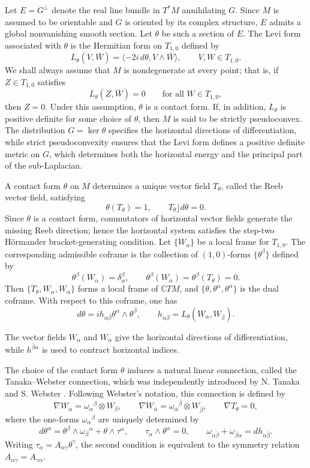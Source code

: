 \documentclass[11pt]{article}
\numberwithin{equation}{section}
\numberwithin{equation}{section}
\begin{document}
	Let \(E=G^\perp\) denote the real line bundle in \(T^*M\) annihilating \(G\). Since \(M\) is assumed to be orientable and \(G\) is oriented by its complex structure, \(E\) admits a global nonvanishing smooth section. Let \(\theta\) be such a section of \(E\). The Levi form associated with \(\theta\) is the Hermitian form on \(T_{1,0}\) defined by
	\[
	L_\theta(V,\bar W) = \langle -2i\,d\theta, V\wedge \bar W\rangle, \qquad V,W\in T_{1,0}.
	\]
	We shall always assume that \(M\) is nondegenerate at every point; that is, if \(Z\in T_{1,0}\) satisfies
	\[
	L_\theta(Z,\bar W)=0 \qquad \text{for all } W\in T_{1,0},
	\]
	then \(Z=0\). Under this assumption, \(\theta\) is a contact form. If, in addition, \(L_\theta\) is positive definite for some choice of \(\theta\), then \(M\) is said to be strictly pseudoconvex. The distribution \(G=\ker\theta\) specifies the horizontal directions
	of differentiation, while strict pseudoconvexity ensures that the Levi form defines a positive definite metric on \(G\), which determines both the horizontal energy and the principal part of the sub-Laplacian.
	
	A contact form \(\theta\) on \(M\) determines a unique vector field \(T_\theta\), called the Reeb vector field, satisfying
	\[
	\theta(T_\theta)=1, \qquad T_\theta\rfloor d\theta=0.
	\]
	Since \(\theta\) is a contact form, commutators of horizontal vector
	fields generate the missing Reeb direction; hence the horizontal system satisfies the step-two H\"ormander bracket-generating condition.
	Let \(\{W_\alpha\}\) be a local frame for \(T_{1,0}\). The corresponding admissible coframe is the collection of \((1,0)\)-forms \(\{\theta^\beta\}\) defined by
	\[
	\theta^\beta(W_\alpha)=\delta_\alpha^\beta, \qquad \theta^\beta(W_{\bar\alpha})=\theta^\beta(T_\theta)=0.
	\]
	Then \(\{T_\theta,W_\alpha,W_{\bar\alpha}\}\) forms a local frame of \(\mathbb C TM\), and \(\{\theta,\theta^\alpha,\theta^{\bar\alpha}\}\) is the dual coframe. With respect to this coframe, one has
	\[
	d\theta= i h_{\alpha\bar\beta} \theta^\alpha\wedge\theta^{\bar\beta}, \qquad h_{\alpha\bar\beta} = L_\theta(W_\alpha,W_{\bar\beta}).
	\]

	The vector fields \(W_\alpha\) and \(W_{\bar\alpha}\) give the horizontal directions of differentiation, while \(h^{\bar\beta\alpha}\) is used to contract horizontal indices.
	
	The choice of the contact form \(\theta\) induces a natural linear connection, called the Tanaka--Webster connection, which was independently introduced by N. Tanaka \cite{T1975} and S. Webster \cite{W1978}. Following Webster's notation, this connection is defined by
	\[
	\nabla W_\alpha = {\omega_\alpha}^{\beta}\otimes W_\beta, \qquad \nabla W_{\bar\alpha} = {\omega_{\bar\alpha}}^{\bar\beta}\otimes W_{\bar\beta}, \qquad \nabla T_\theta=0, \]
	where the one-forms \({\omega_\alpha}^{\beta}\) are uniquely determined by
	\[
	d\theta^\alpha = \theta^\beta\wedge {\omega_\beta}^{\alpha} + \theta\wedge \tau^\alpha, \qquad \tau_\alpha\wedge \theta^\alpha=0, \qquad \omega_{\alpha\bar\beta} + \omega_{\bar\beta\alpha} = d h_{\alpha\bar\beta}.
	\]
	Writing \(\tau_\alpha=A_{\alpha\gamma}\theta^\gamma\), the second condition is equivalent to the symmetry relation \(A_{\alpha\gamma}=A_{\gamma\alpha}\). 
\end{document}
